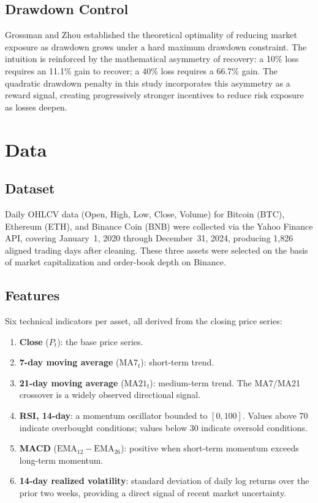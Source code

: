 \documentclass[pdflatex,sn-mathphys-num]{sn-jnl}
\begin{document}
\subsection{Drawdown Control}

Grossman and Zhou \cite{grossman1993portfolio} established the theoretical
optimality of reducing market exposure as drawdown grows under a hard maximum
drawdown constraint. The intuition is reinforced by the mathematical asymmetry
of recovery: a 10\% loss requires an 11.1\% gain to recover; a 40\% loss
requires a 66.7\% gain. The quadratic drawdown penalty in this study
incorporates this asymmetry as a reward signal, creating progressively stronger
incentives to reduce risk exposure as losses deepen.

\section{Data}\label{sec:data}

\subsection{Dataset}

Daily OHLCV data (Open, High, Low, Close, Volume) for Bitcoin (BTC), Ethereum
(ETH), and Binance Coin (BNB) were collected via the Yahoo Finance API, covering
January~1, 2020 through December~31, 2024, producing 1,826 aligned trading days
after cleaning. These three assets were selected on the basis of market
capitalization and order-book depth on Binance.

\subsection{Features}

Six technical indicators per asset, all derived from the closing price series:

\begin{enumerate}[leftmargin=*]
\item \textbf{Close} ($P_t$): the base price series.
\item \textbf{7-day moving average} ($\mathrm{MA7}_t$): short-term trend.
\item \textbf{21-day moving average} ($\mathrm{MA21}_t$): medium-term trend. The MA7/MA21 crossover is a widely observed directional signal.
\item \textbf{RSI, 14-day}: a momentum oscillator bounded to $[0, 100]$. Values above 70 indicate overbought conditions; values below 30 indicate oversold conditions.
\item \textbf{MACD} ($\mathrm{EMA}_{12} - \mathrm{EMA}_{26}$): positive when short-term momentum exceeds long-term momentum.
\item \textbf{14-day realized volatility}: standard deviation of daily log returns over the prior two weeks, providing a direct signal of recent market uncertainty.
\end{enumerate}
\end{document}
